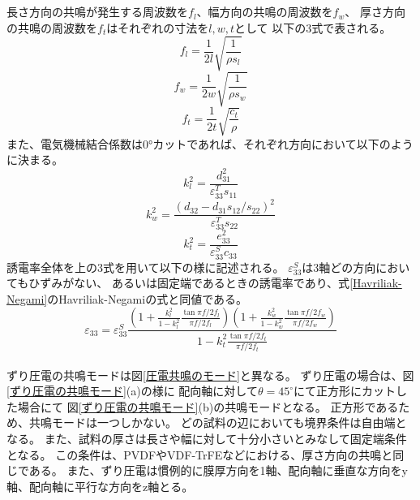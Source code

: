 \documentclass[dvipdfmx,12pt,a4paper]{jreport}
\begin{document}
			\\ \\
			長さ方向の共鳴が発生する周波数を$f_l$、幅方向の共鳴の周波数を$f_w$、
			厚さ方向の共鳴の周波数を$f_t$はそれぞれの寸法を$l, w, t$として
			以下の3式で表される。
			\begin{equation}
				f_l = \frac{1}{2l}\sqrt{\frac{1}{\rho s_l}}
			\end{equation} 
			\begin{equation}
				f_w = \frac{1}{2w}\sqrt{\frac{1}{\rho s_w}}
			\end{equation}
			\begin{equation}
				f_t = \frac{1}{2t}\sqrt{\frac{c_t}{\rho}}
			\end{equation} 
			また、電気機械結合係数は0°カットであれば、それぞれ方向において以下のように決まる。
			\begin{equation}
				k_l^2 = \frac{d_{31}^2}{\varepsilon_{33}^T s_{11}}
			\end{equation}
			\begin{equation}
				k_w^2 = \frac{\left(d_{32} - d_{31}s_{12}/s_{22} \right)^2}
				{\varepsilon_{33}^T s_{22}}
			\end{equation}
			\begin{equation}
				k_t^2 = \frac{e_{33}^2}{\varepsilon_{33}^S c_{33}}
			\end{equation}
			誘電率全体を上の3式を用いて以下の様に記述される。
			$\varepsilon_{33}^S$は3軸どの方向においてもひずみがない、
			あるいは固定端であるときの誘電率であり、式\ref{Havriliak-Negami}のHavriliak-Negamiの式と同値である。
			\begin{equation}
				\varepsilon_{33} =
				\varepsilon_{33}^S
				\frac{\left(1+\frac{k_l^2}{1-k_l^2}\frac{\tan{\pi f/2f_l}}{\pi f/2f_l}\right)
				\left( 
					1+\frac{k_w^2}{1-k_w^2}\frac{\tan{\pi f/2f_w}}{\pi f/2f_w}
				\right)
				}
				{1-k_t^2\frac{\tan{\pi f/2f_t}}{\pi f/2f_t}}
				\label{normal_piezo_resonance}
			\end{equation}
			\\
			ずり圧電の共鳴モードは図\ref{圧電共鳴のモード}と異なる。
			ずり圧電の場合は、図\ref{ずり圧電の共鳴モード}(a)の様に
			配向軸に対して$\theta=45^\circ$にて正方形にカットした場合にて
			図\ref{ずり圧電の共鳴モード}(b)の共鳴モードとなる。
			正方形であるため、共鳴モードは一つしかない。
			どの試料の辺においても境界条件は自由端となる。
			また、試料の厚さは長さや幅に対して十分小さいとみなして固定端条件となる。
			この条件は、PVDFやVDF-TrFEなどにおける、厚さ方向の共鳴と同じである。
			また、ずり圧電は慣例的に膜厚方向を1軸、配向軸に垂直な方向をy軸、配向軸に平行な方向をz軸とる。
\end{document}
